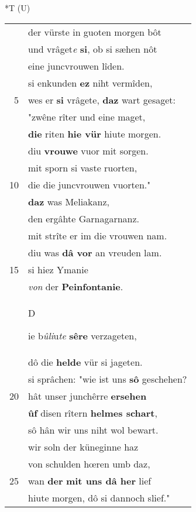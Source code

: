 \documentclass[8pt,a4paper,notitlepage]{article}
\begin{document}
\begin{table}[ht]
\begin{minipage}[t]{0.5\linewidth}
\end{minipage}
\hspace{0.5cm}
\begin{minipage}[t]{0.5\linewidth}
\small
\begin{center}*T (U)
\end{center}
\begin{tabular}{rl}
 & der vürste in guoten morgen bôt\\ 
 & und vrâget\textit{e} \textbf{si}, ob si sæhen nôt\\ 
 & eine juncvrouwen lîden.\\ 
 & si enkunden \textbf{ez} niht vermîden,\\ 
5 & wes er \textbf{si} vrâgete, \textbf{daz} wart gesaget:\\ 
 & "zwêne rîter und eine maget,\\ 
 & \textbf{die} riten \textbf{hie vür} hiute morgen.\\ 
 & diu \textbf{vrouwe} vuor mit sorgen.\\ 
 & mit sporn si vaste ruorten,\\ 
10 & die die juncvrouwen vuorten."\\ 
 & \textbf{daz} was Meliakanz,\\ 
 & den ergâhte Garnagarnanz.\\ 
 & mit strîte er im die vrouwen nam.\\ 
 & diu was \textbf{dâ vor} an vreuden lam.\\ 
15 & si hiez Ymanie\\ 
 & \textit{von} der \textbf{Peinfontanie}.\\ 
 & \begin{large}D\end{large}ie b\textit{ûli}u\textit{te} \textbf{sêre} verzageten,\\ 
 & dô die \textbf{helde} vür si jageten.\\ 
 & si sprâchen: "wie ist uns \textbf{sô} geschehen?\\ 
20 & hât unser junchêrre \textbf{ersehen}\\ 
 & \textbf{ûf} disen rîtern \textbf{helmes schart},\\ 
 & sô hân wir uns niht wol bewart.\\ 
 & wir soln der küneginne haz\\ 
 & von schulden hœren umb daz,\\ 
25 & wan \textbf{der} \textbf{mit uns dâ her} lief\\ 
 & hiute morgen, dô si dannoch slief."\\ 

\end{tabular}
\end{minipage}
\end{table}
\end{document}
